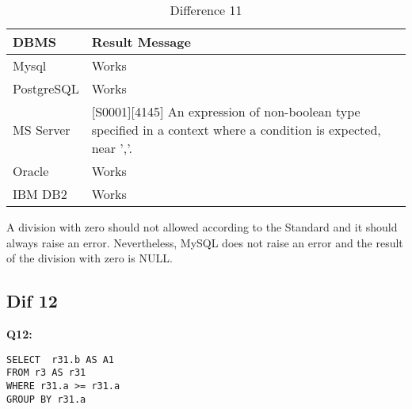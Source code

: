 \begin{table}[h]
\centering
\caption{Difference 11}
\label{my-label}
\begin{tabular}{|p{2cm}|p{11.5cm}|}
\hline
\textbf{DBMS} & \textbf{Result Message}                                                                                                 \\ \hline
Mysql         & Works                                                                                                                   \\ \hline
PostgreSQL    & Works                                                                                                                   \\ \hline
MS Server     & {[}S0001{]}{[}4145{]} An expression of non-boolean type specified in a context where a condition is expected, near ','. \\ \hline
Oracle        & Works                                                                                                                   \\ \hline
IBM DB2       & Works                                                                                                                   \\ \hline
\end{tabular}
\end{table}

A division with zero should not allowed  according to the Standard and it should  always raise an error. Nevertheless, MySQL does not raise an error and the result of the division with zero is NULL. 


\subsection{Dif 12}
 
\textbf{Q12:}
\begin{mdframed}[backgroundcolor=lightgray!20]
\begin{lstlisting}[style=SQL]
SELECT  r31.b AS A1
FROM r3 AS r31
WHERE r31.a >= r31.a
GROUP BY r31.a
\end{lstlisting}
\end{mdframed}
 
